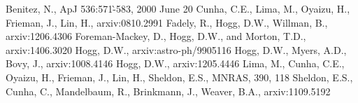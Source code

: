 \documentclass[12pt, onecolumn]{emulateapj}
\begin{document}
\begin{thebibliography}{}
Benitez, N., ApJ 536:571-̀583, 2000 June 20
Cunha, C.E., Lima, M., Oyaizu, H., Frieman, J., Lin, H., arxiv:0810.2991
Fadely, R., Hogg, D.W., Willman, B., arxiv:1206.4306
Foreman-Mackey, D., Hogg, D.W., and Morton, T.D., arxiv:1406.3020
Hogg, D.W., arxiv:astro-ph/9905116
Hogg, D.W., Myers, A.D., Bovy, J., arxiv:1008.4146
Hogg, D.W., arxiv:1205.4446
Lima, M., Cunha, C.E., Oyaizu, H., Frieman, J., Lin, H., Sheldon, E.S., MNRAS, 390, 118
Sheldon, E.S., Cunha, C., Mandelbaum, R., Brinkmann, J., Weaver, B.A., arxiv:1109.5192
\end{thebibliography}
\end{document}
